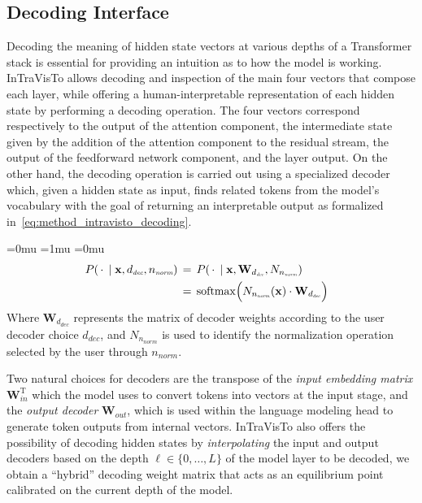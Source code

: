 \documentclass[11pt,a4paper,twocolumn]{article}
\newcommand{\gbm}[1]{\bm{\mathbf{#1}}} %
\renewcommand{\T}{\mathrm{T}} %
\begin{document}
\subsection{Decoding Interface}\label{ssec:intravisto_1}

Decoding the meaning of hidden state vectors at various depths of a Transformer stack is essential for providing an intuition as to how the model is working.
InTraVisTo allows decoding and inspection of the main four vectors that compose each layer, while offering a human-interpretable representation of each hidden state by performing a decoding operation.
The four vectors correspond respectively to the output of the attention component, the intermediate state given by the addition of the attention component to the residual stream, the output of the feedforward network component, and the layer output.
On the other hand, the decoding operation is carried out using a specialized decoder which, given a hidden state as input, finds related tokens from the model's vocabulary with the goal of returning an interpretable output as formalized in~\cref{eq:method_intravisto_decoding}.

\vspace{-12pt}
{
\medmuskip=0mu
\thinmuskip=1mu
\thickmuskip=0mu
\scriptspace=0pt
\begin{equation}
\label{eq:method_intravisto_decoding}
\hspace{-10pt}
\begin{aligned}
P(\,\cdot\,\mid \gbm{x}, d_\textit{\scalebox{.8}{dec}}, n_\textit{\scalebox{.8}{norm}}) \,&=\, P(\,\cdot\,\mid \gbm{x}, \gbm{W}_{d_\textit{\scalebox{.8}{dec}}}, N_{n_\textit{\scalebox{.8}{norm}}}) \\
&=\,\operatorname{softmax}\Bigl(N_{n_\textit{\scalebox{.8}{norm}}}(\gbm{x}) \cdot \gbm{W}_{d_\textit{\scalebox{.8}{dec}}}\Bigr)
\end{aligned}
\end{equation}
}
Where $\gbm{W}_{d_\textit{dec}}$ represents the matrix of decoder weights according to the user decoder choice $d_\textit{dec}$, and $N_{n_\textit{norm}}$ is used to identify the normalization operation selected by the user through $n_\textit{norm}$.

Two natural choices for decoders are the transpose of the \emph{input embedding matrix} $\gbm{W}_\textit{in}^\T$ which the model uses to convert tokens into vectors at the input stage, and the \emph{output decoder} $\gbm{W}_\textit{out}$, which is used within the language modeling head to generate token outputs from internal vectors.
InTraVisTo also offers the possibility of decoding hidden states by \emph{interpolating} the input and output decoders based on the depth $\ell\in\{0,\ldots,L\}$ of the model layer to be decoded, we obtain a ``hybrid'' decoding weight matrix that acts as an equilibrium point calibrated on the current depth of the model.
\end{document}
